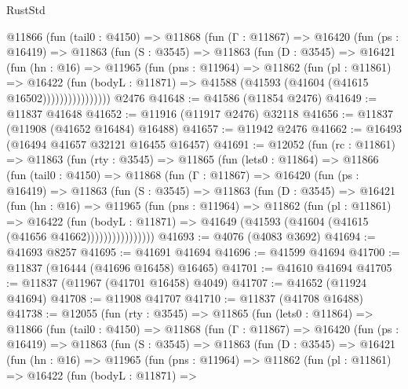 \begin{lexlean}{RustStd}
\begin{coremodule}
{\begin{coremodule}
{{{{{{{{{{{{{{{{{{{{{{{{{{{{{{{{{{{{{{{{{{{{{{{{{{          @11866
            (fun (tail0 : @4150) =>
            @11868
              (fun (Γ : @11867) =>
              @16420
                (fun (ps : @16419) =>
                @11863
                  (fun (S : @3545) =>
                  @11863
                    (fun (D : @3545) =>
                    @16421
                      (fun (hn : @16) =>
                      @11965
                        (fun (pns : @11964) =>
                        @11862
                          (fun (pl : @11861) =>
                          @16422
                            (fun (bodyL : @11871) =>
                            @41588 (@41593 (@41604 (@41615 @16502))))))))))))))))
    @2476
@41648 := @41586 (@11854 @2476)
@41649 := @11837 @41648
@41652 := @11916 (@11917 @2476) @32118
@41656 := @11837 (@11908 (@41652 @16484) @16488)
@41657 := @11942 @2476
@41662 := @16493 (@16494 @41657 @32121 @16455 @16457)
@41691 := @12052
    (fun (rc : @11861) =>
    @11863
      (fun (rty : @3545) =>
      @11865
        (fun (lets0 : @11864) =>
        @11866
          (fun (tail0 : @4150) =>
          @11868
            (fun (Γ : @11867) =>
            @16420
              (fun (ps : @16419) =>
              @11863
                (fun (S : @3545) =>
                @11863
                  (fun (D : @3545) =>
                  @16421
                    (fun (hn : @16) =>
                    @11965
                      (fun (pns : @11964) =>
                      @11862
                        (fun (pl : @11861) =>
                        @16422
                          (fun (bodyL : @11871) =>
                          @41649 (@41593 (@41604 (@41615 (@41656 @41662))))))))))))))))
@41693 := @4076 (@4083 @3692)
@41694 := @41693 @8257
@41695 := @41691 @41694
@41696 := @41599 @41694
@41700 := @11837 (@16444 (@41696 @16458) @16465)
@41701 := @41610 @41694
@41705 := @11837 (@11967 (@41701 @16458) @4049)
@41707 := @41652 (@11924 @41694)
@41708 := @11908 @41707
@41710 := @11837 (@41708 @16488)
@41738 := @12055
    (fun (rty : @3545) =>
    @11865
      (fun (lets0 : @11864) =>
      @11866
        (fun (tail0 : @4150) =>
        @11868
          (fun (Γ : @11867) =>
          @16420
            (fun (ps : @16419) =>
            @11863
              (fun (S : @3545) =>
              @11863
                (fun (D : @3545) =>
                @16421
                  (fun (hn : @16) =>
                  @11965
                    (fun (pns : @11964) =>
                    @11862
                      (fun (pl : @11861) =>
                      @16422
                        (fun (bodyL : @11871) =>
}}}}}}}}}}}}}}}}}}}}}}}}}}}}}}}}}}}}}}}}}}}}}}}}}}
\end{coremodule}}
\end{coremodule}
\end{lexlean}
